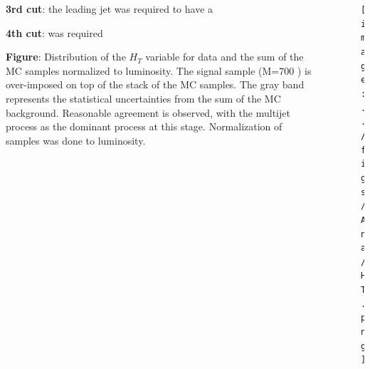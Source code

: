 \begin{frame}{}
\vspace{-.2cm}

\begin{columns}
\begin{column}{.50\textwidth}
\begin{block}{}
\scriptsize \textbf{3rd cut}: the leading jet was required to have a 
\end{block}
\vspace{-.2cm}
\begin{block}{}
\scriptsize \textbf{4th cut}:  was required
\end{block}
\vspace{-.2cm}
\begin{block}{}
\scriptsize \textbf{Figure}: Distribution of the $H_{T}$ variable for data and the sum of the MC samples normalized to luminosity. The signal sample (M=700 \GeVcc) is over-imposed on top of the stack of the MC samples. The gray band represents the statistical uncertainties from the sum of the MC background. Reasonable agreement is observed, with the multijet process as the dominant process at this stage. Normalization of samples was done to luminosity.
\end{block}
\end{column}

\begin{column}{.50\textwidth}
\begin{figure}[!Hhtbp]
  \begin{center}
    \texttt{[image: ../figs/Ana/HT.png]}
  \end{center}
\end{figure}
\end{column}

\end{columns}
\end{frame}

